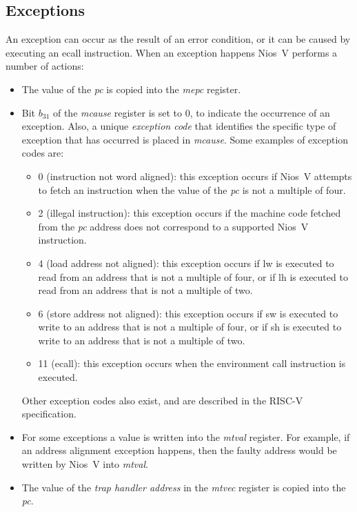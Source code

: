 \documentclass[11pt, twoside, pdftex]{article}
\begin{document}
\subsection{Exceptions}
\label{sec:exceptions}
An exception can occur as the result of an error condition, or it can be caused by
executing an {\sf ecall} instruction. When an exception happens Nios~V performs a number
of actions:
\vspace{-\baselineskip}
\begin{itemize}
\item The value of the {\it pc} is copied into the {\it mepc} register. 
\item Bit $b_{31}$ of the {\it mcause} register is set to 0, to indicate the occurrence of an
exception. Also, a unique {\it exception code} that identifies the specific type of exception that
has occurred is placed in {\it mcause}. Some examples of exception codes are: 
\begin{itemize}
\item 0 (instruction not word aligned): this exception occurs if Nios~V attempts to fetch
an instruction when the value of the {\it pc} is not a multiple of four.
\item 2 (illegal instruction): this exception occurs if the machine code fetched from the
{\it pc} address does not correspond to a supported Nios~V instruction.
\item 4 (load address not aligned): this exception occurs if {\sf lw} is executed
to read from an address that is not a multiple of four, or if {\sf lh} is executed to read
from an address that is not a multiple of two.
\item 6 (store address not aligned): this exception occurs if {\sf sw} is executed
to write to an address that is not a multiple of four, or if {\sf sh} is executed to write
to an address that is not a multiple of two.
\item 11 (ecall): this exception occurs when the environment
call instruction is executed.
\end{itemize}

Other exception codes also exist, and are described in the RISC-V specification.

\item For some exceptions a value is written into the {\it mtval} register. For example,
if an address alignment exception happens, then the faulty address would be written by
Nios~V into {\it mtval}.
\item The value of the {\it trap handler address} in the {\it mtvec} register is copied 
into the {\it pc}.
\end{itemize}
\end{document}
